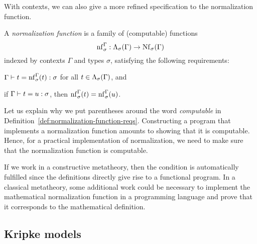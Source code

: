 With contexts, we can also give a more refined specification to the normalization function.

\begin{defn} \label{def:normalization-function-reqs}
A \emph{normalization function} is a family of (computable) functions
\[ \mathrm{nf}^{\Gamma}_{\sigma} : \Lambda_{\sigma}(\Gamma) \to \mathrm{Nf}_{\sigma}(\Gamma) \]
indexed by contexts $\Gamma$ and types $\sigma$, satisfying the following requirements:
\begin{enum}
    \item $\Gamma \vdash t = \mathrm{nf}^{\Gamma}_{\sigma}(t) : \sigma$ for all $t \in \Lambda_{\sigma}(\Gamma)$, and
    \item if $\Gamma \vdash t = u : \sigma$, then $\mathrm{nf}^{\Gamma}_{\sigma}(t) = \mathrm{nf}^{\Gamma}_{\sigma}(u)$.
\end{enum}
\end{defn}


\begin{rem}
Let us explain why we put parentheses around the word \textit{computable} in Definition~\ref{def:normalization-function-reqs}. Constructing a program that implements a normalization function amounts to showing that it is computable. Hence, for a practical implementation of normalization, we need to make sure that the normalization function is computable.

If we work in a constructive metatheory, then the condition is automatically fulfilled since the definitions directly give rise to a functional program. In a classical metatheory, some additional work could be necessary to implement the mathematical normalization function in a programming language and prove that it corresponds to the mathematical definition.
\end{rem}

\subsection{Kripke models} \label{sec:Kripke-models}

